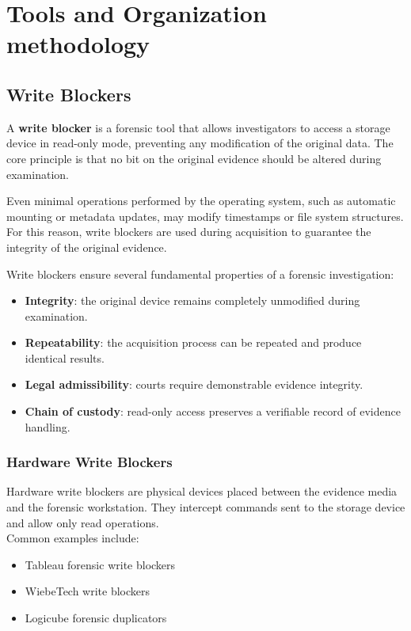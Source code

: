\section{Tools and Organization methodology}


\subsection{Write Blockers}

A \textbf{write blocker} is a forensic tool that allows investigators to access a storage device in read-only mode, preventing any modification of the original data. The core principle is that no bit on the original evidence should be altered during examination.
\medskip

\noindent
Even minimal operations performed by the operating system, such as automatic mounting or metadata updates, may modify timestamps or file system structures. \\
For this reason, write blockers are used during acquisition to guarantee the integrity of the original evidence.
\bigskip

\noindent
Write blockers ensure several fundamental properties of a forensic investigation:

\begin{itemize}
\item \textbf{Integrity}: the original device remains completely unmodified during examination.
\item \textbf{Repeatability}: the acquisition process can be repeated and produce identical results.
\item \textbf{Legal admissibility}: courts require demonstrable evidence integrity.
\item \textbf{Chain of custody}: read-only access preserves a verifiable record of evidence handling.
\end{itemize}

\subsubsection{Hardware Write Blockers}

Hardware write blockers are physical devices placed between the evidence media and the forensic workstation. They intercept commands sent to the storage device and allow only read operations.\\
Common examples include:

\begin{itemize}
\item Tableau forensic write blockers
\item WiebeTech write blockers
\item Logicube forensic duplicators
\end{itemize}

